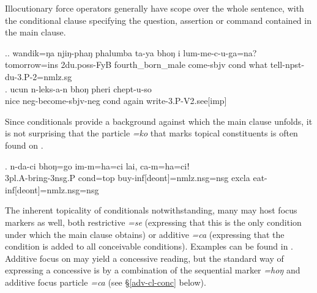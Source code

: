 			
Illocutionary force operators generally have scope over the whole sentence, with the conditional clause specifying the question, assertion or command contained in the main clause. 

\ex.\ag. wandik=ŋa njiŋ-phaŋ  phalumba            ta-ya             bhoŋ i    lum-me-c-u-ga=na? \\
tomorrow{\sc =ins} {\sc 2du.poss-}FyB fourth\_born\_male come{\sc [3sg]-sbjv} {\sc cond} what tell{\sc -npst-du-3.P-2=nmlz.sg}\\
 
\bg. ucun n-leks-a-n bhoŋ pheri chept-u-so\\
nice {\sc neg-}become{\sc -sbjv-neg} {\sc cond} again write{\sc -3.P-V2.see[imp]}\\


Since conditionals provide a background against which the main clause unfolds, it is not surprising that the particle \emph{=ko} that marks topical constituents is often found on  \Next.

\exg. n-da-ci      bhoŋ=go     im-m=ha=ci   lai,  ca-m=ha=ciǃ\\
{\sc 3pl.A-}bring{\sc -3nsg.P} {\sc cond=top} buy{\sc -inf[deont]=nmlz.nsg=nsg}  {\sc excla} eat{\sc -inf[deont]=nmlz.nsg=nsg}\\
 

The inherent topicality of conditionals notwithstanding, many  may host focus markers as well, both restrictive \emph{=se} (expressing that this is the only condition under which the main clause obtains) or additive \emph{=ca} (expressing that the condition is added to all conceivable conditions). Examples can be found in \Next. Additive focus on  may yield a concessive reading, but the standard way of expressing  a concessive is by a combination of the sequential marker \emph{=hoŋ} and additive focus particle \emph{=ca} (see §\ref{adv-cl-conc} below).

